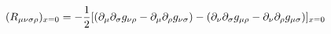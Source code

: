 \begin{equation}
    (R_{\mu\nu\sigma\rho})_{x=0}=-\frac{1}{2}[(\partial_\mu\partial_\sigma g_{\nu\rho}-\partial_\mu\partial_\rho g_{\nu\sigma})-(\partial_\nu\partial_\sigma g_{\mu\rho}-\partial_\nu\partial_\rho g_{\mu\sigma})]_{x=0}
\end{equation}
\begin{comment}
\begin{equation}
    Q_{abcd}=+t_{acbd}-t_{adbc}-t_{bcad}+t_{bdac}
\end{equation}
\begin{equation}
    Q_{bcad}=+t_{bacd}-t_{bdca}-t_{cabd}+t_{cdba}
\end{equation}
\begin{equation}
    Q_{cabd}=+t_{cbad}-t_{cdab}-t_{abcd}+t_{adcb}
\end{equation}
\end{comment}
\cite{Ni1978}
